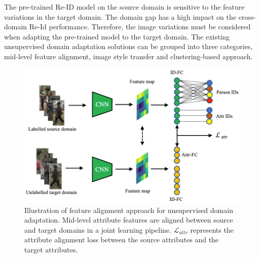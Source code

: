 \documentclass[a4paper,fleqn]{cas-dc}
\begin{document}
The pre-trained Re-ID model on the source domain is sensitive to the feature variations in the target domain. The domain gap has a high impact on the cross-domain Re-Id performance. Therefore, the image variations must be considered when adapting the pre-trained model to the target domain. The existing unsupervised domain adaptation solutions can be grouped into three categories, mid-level feature alignment, image style transfer and clustering-based approach.
\begin{figure}[t]
\begin{center}
\includegraphics [width=.75\linewidth]{feature.PNG}
\end{center}
  \caption{ Illustration of feature alignment approach for unsupervised domain adaptation. Mid-level attribute features are aligned between source and target domains in a joint learning pipeline. $\mathcal{L}_{attr}$ represents the attribute alignment loss between the source attributes and the target attributes.}
\label{fig:fa}
\end{figure}
\end{document}
